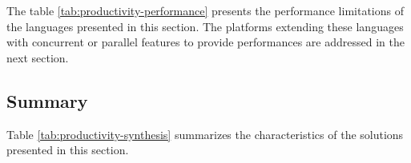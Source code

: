 
% 


The table \ref{tab:productivity-performance} presents the performance limitations of the languages presented in this section.
The platforms extending these languages with concurrent or parallel features to provide performances are addressed in the next section.



\subsection{Summary} \label{chapter3:software-productivity:summary}

Table \ref{tab:productivity-synthesis} summarizes the characteristics of the solutions presented in this section.


\endinput






































